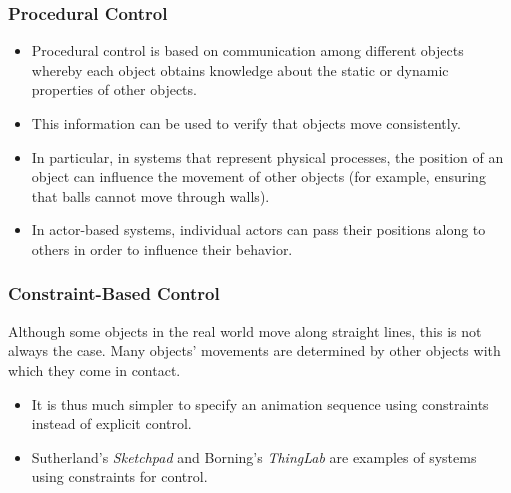 \subsubsection{Procedural Control}
\begin{itemize}
	\item Procedural control is based on communication among different objects whereby each object obtains knowledge about the static or dynamic properties of other objects. \item This information can be used to verify that objects move consistently.
	\item In particular, in systems that represent physical processes, the position of an object can influence the movement of other objects (for example, ensuring that balls cannot move through walls). 
	\item In actor-based systems, individual actors can pass their positions along to others in order to influence their behavior.
\end{itemize}


\subsubsection{Constraint-Based Control}
Although some objects in the real world move along straight lines, this is not always the case. Many objects’ movements are determined by other objects with which they come in contact.
\begin{itemize}
	\item It is thus much simpler to specify an animation sequence using constraints instead of explicit control. 
	\item Sutherland's \textit{Sketchpad} and Borning's \textit{ThingLab} are examples of systems using constraints for control.
\end{itemize}


